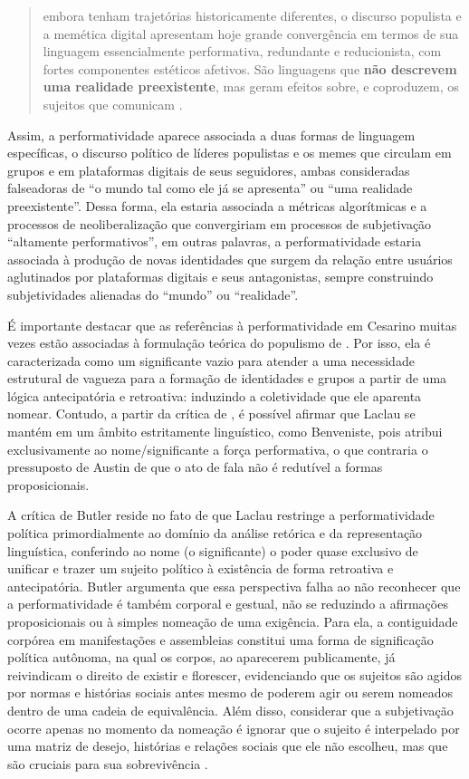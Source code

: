 \documentclass[portuguese]{textolivre}
\begin{document}
\begin{quote}
    embora tenham trajetórias historicamente diferentes, o discurso populista e a memética digital apresentam hoje grande convergência em termos de sua linguagem essencialmente performativa, redundante e reducionista, com fortes componentes estéticos afetivos. São linguagens que \textbf{não descrevem uma realidade preexistente}, mas geram efeitos sobre, e coproduzem, os sujeitos que comunicam \cite[p. 86, grifos nossos]{cesarino2021b}.
\end{quote}

Assim, a performatividade aparece associada a duas formas de linguagem específicas, o discurso político de líderes populistas e os memes que circulam em grupos e em plataformas digitais de seus seguidores, ambas consideradas falseadoras de “o mundo tal como ele já se apresenta” ou “uma realidade preexistente”. Dessa forma, ela estaria associada a métricas algorítmicas e a processos de neoliberalização que convergiriam em processos de subjetivação “altamente performativos”, em outras palavras, a performatividade estaria associada à produção de novas identidades que surgem da relação entre usuários aglutinados por plataformas digitais e seus antagonistas, sempre construindo subjetividades alienadas do “mundo” ou “realidade”.

É importante destacar que as referências à performatividade em Cesarino muitas vezes estão associadas à formulação teórica do populismo de \textcite{laclau2005populist}. Por isso, ela é caracterizada como um significante vazio para atender a uma necessidade estrutural de vagueza para a formação de identidades e grupos a partir de uma lógica antecipatória e retroativa: induzindo a coletividade que ele aparenta nomear. Contudo, a partir da crítica de \textcite{butler2024laclau}, é possível afirmar que Laclau se mantém em um âmbito estritamente linguístico, como Benveniste, pois atribui exclusivamente ao nome/significante a força performativa, o que contraria o pressuposto de Austin de que o ato de fala não é redutível a formas proposicionais.

A crítica de Butler reside no fato de que Laclau restringe a performatividade política primordialmente ao domínio da análise retórica e da representação linguística, conferindo ao nome (o significante) o poder quase exclusivo de unificar e trazer um sujeito político à existência de forma retroativa e antecipatória. Butler argumenta que essa perspectiva falha ao não reconhecer que a performatividade é também corporal e gestual, não se reduzindo a afirmações proposicionais ou à simples nomeação de uma exigência. Para ela, a contiguidade corpórea em manifestações e assembleias constitui uma forma de significação política autônoma, na qual os corpos, ao aparecerem publicamente, já reivindicam o direito de existir e florescer, evidenciando que os sujeitos são agidos por normas e histórias sociais antes mesmo de poderem agir ou serem nomeados dentro de uma cadeia de equivalência. Além disso, considerar que a subjetivação ocorre apenas no momento da nomeação é ignorar que o sujeito é interpelado por uma matriz de desejo, histórias e relações sociais que ele não escolheu, mas que são cruciais para sua sobrevivência \cite{butler2024laclau}.
\end{document}
